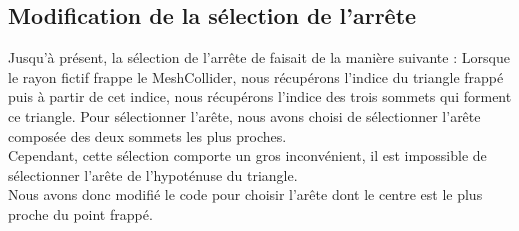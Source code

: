 \documentclass[a4paper,oneside,12pt,titlepage]{article}
\begin{document}
\subsection{Modification de la sélection de l'arrête}
Jusqu'à présent, la sélection de l'arrête de faisait de la manière suivante : Lorsque le rayon fictif frappe le MeshCollider, nous récupérons l'indice du triangle frappé puis à partir de cet indice, nous récupérons l'indice des trois sommets qui forment ce triangle. Pour sélectionner l'arête, nous avons choisi de sélectionner l'arête composée des deux sommets les plus proches. 
\\Cependant, cette sélection comporte un gros inconvénient, il est impossible de sélectionner l'arête de l'hypoténuse du triangle. \\
Nous avons donc modifié le code pour choisir l'arête dont le centre est le plus proche du point frappé.
\end{document}
